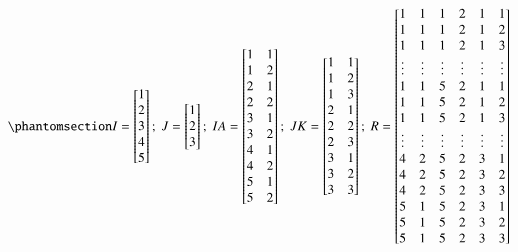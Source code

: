 \documentclass[
  authoryear,
  review,
  1p]{elsarticle}
\begin{document}
\begin{equation}\phantomsection\label{eq-mat13}{
I = \begin{bmatrix}
1 \\
2 \\
3 \\
4 \\
5 
\end{bmatrix} ; \;
J = \begin{bmatrix}
1 \\
2 \\
3 
\end{bmatrix} ; \;
IA = \begin{bmatrix}
1 & 1 \\
1 & 2 \\
2 & 1 \\
2 & 2 \\
3 & 1 \\
3 & 2 \\
4 & 1 \\
4 & 2 \\
5 & 1 \\
5 & 2 
\end{bmatrix} ; \;
JK = \begin{bmatrix}
1 & 1 \\
1 & 2 \\
1 & 3 \\
2 & 1 \\
2 & 2 \\
2 & 3 \\
3 & 1 \\
3 & 2 \\
3 & 3 
\end{bmatrix} ; \;
R = \begin{bmatrix}
1 & 1 & 1 & 2 & 1 & 1 \\
1 & 1 & 1 & 2 & 1 & 2 \\
1 & 1 & 1 & 2 & 1 & 3 \\
\vdots & \vdots & \vdots & \vdots & \vdots & \vdots\\
1 & 1 & 5 & 2 & 1 & 1 \\
1 & 1 & 5 & 2 & 1 & 2 \\
1 & 1 & 5 & 2 & 1 & 3 \\
\vdots & \vdots & \vdots & \vdots & \vdots & \vdots\\
4 & 2 & 5 & 2 & 3 & 1 \\
4 & 2 & 5 & 2 & 3 & 2 \\
4 & 2 & 5 & 2 & 3 & 3 \\
5 & 1 & 5 & 2 & 3 & 1 \\
5 & 1 & 5 & 2 & 3 & 2 \\
5 & 1 & 5 & 2 & 3 & 3 
\end{bmatrix}
}\end{equation}
\end{document}
